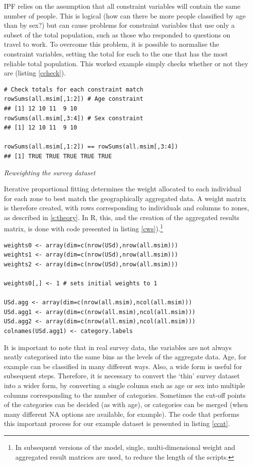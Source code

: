 \documentclass[a4paper, 11pt, twoside]{Thesis}
\begin{document}
IPF relies on the assumption that all constraint variables will contain the
same number of people. This is logical (how can there be more people classified
by age than by sex?) but can cause problems for constraint variables that use
only a subset of the total population, such as those who responded to questions on
travel to work. To overcome this problem, it is possible to normalise the
constraint variables, setting the total for each to the one that has the most
reliable total population. This worked example simply checks whether
or not they are (listing \ref{ccheck}).

\begin{lstlisting}[float=h, caption={R code to check the constrain populations
match}, label=ccheck]
 # Check totals for each constraint match
rowSums(all.msim[,1:2]) # Age constraint
## [1] 12 10 11  9 10
rowSums(all.msim[,3:4]) # Sex constraint
## [1] 12 10 11  9 10

rowSums(all.msim[,1:2]) == rowSums(all.msim[,3:4])
## [1] TRUE TRUE TRUE TRUE TRUE
\end{lstlisting}

\emph{Reweighting the survey dataset}

Iterative proportional fitting determines the weight allocated to each
individual for each zone to best match the geographically aggregated data.
A weight matrix is therefore created, with rows corresponding to individuals
and columns to zones, as described in \cref{s:theory}. In
R, this, and the creation of the aggregated results matrix,
is done with code presented in listing
\ref{cws}).\footnote{In subsequent
versions of the model, single, multi-dimensional weight and
aggregated result matrices are used,
to reduce the length of the scripts.
} 

\begin{lstlisting}[float=h, caption={Creating arrays of weights in R},
label=cws]
weights0 <- array(dim=c(nrow(USd),nrow(all.msim)))
weights1 <- array(dim=c(nrow(USd),nrow(all.msim)))
weights2 <- array(dim=c(nrow(USd),nrow(all.msim)))

weights0[,] <- 1 # sets initial weights to 1

USd.agg <- array(dim=c(nrow(all.msim),ncol(all.msim)))
USd.agg1 <- array(dim=c(nrow(all.msim),ncol(all.msim)))
USd.agg2 <- array(dim=c(nrow(all.msim),ncol(all.msim)))
colnames(USd.agg1) <- category.labels
\end{lstlisting}

It is important to note that in real survey data, the variables are not
always neatly categorised into the same bins as the levels of the aggregate
data. Age, for example can be classified in many different ways.
Also, a wide form is useful for subsequent steps.
Therefore, it is necessary to convert the `thin' survey dataset
into a wider form, by converting a single column such as age or sex into
multiple columns corresponding to the number of categories. Sometimes the
cut-off points of the categories can be decided (as with age), or categories
can be merged (when many different NA options are available, for example).
The code that performs this important process for our example dataset is
presented in listing \ref{ccat}.
\end{document}
